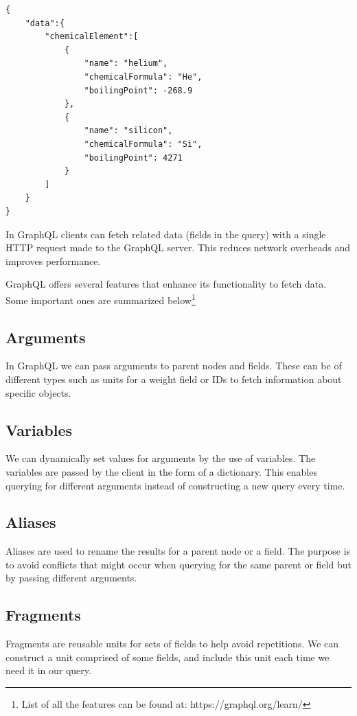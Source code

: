 \begin{minipage}{\linewidth}
\begin{lstlisting}[label=lst:6, caption={Query Results}]
{
	"data":{
		"chemicalElement":[
			{
				"name": "helium",
				"chemicalFormula": "He",
				"boilingPoint": -268.9
			},
			{	
				"name": "silicon",
				"chemicalFormula": "Si",
				"boilingPoint": 4271
			}
		]
	}
}
\end{lstlisting}
\end{minipage}

In GraphQL clients can fetch related data (fields in the query) with a single HTTP request made to the GraphQL server. This reduces network overheads and improves performance.

GraphQL offers several features that enhance its functionality to fetch data. Some important ones are summarized below\footnote{List of all the features can be found at: https://graphql.org/learn/}

\subsection*{Arguments}
In GraphQL we can pass arguments to parent nodes and fields. These can be of different types such as units for a weight field or IDs to fetch information about specific objects.

\subsection*{Variables}
We can dynamically set values for arguments by the use of variables. The variables are passed by the client in the form of a dictionary. This enables querying for different arguments instead of constructing a new query every time.

\subsection*{Aliases}
Aliases are used to rename the results for a parent node or a field. The purpose is to avoid conflicts that might occur when querying for the same parent or field but by passing different arguments.

\subsection*{Fragments}
Fragments are reusable units for sets of fields to help avoid repetitions. We can construct a unit comprised of some fields, and include this unit each time we need it in our query.

